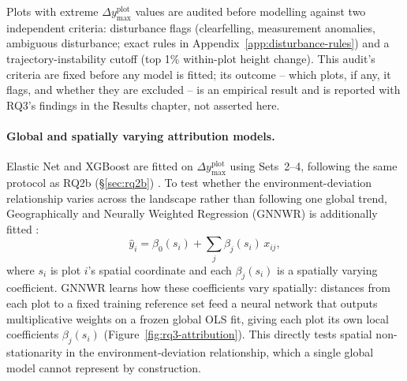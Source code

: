 {Plots with extreme $\Delta y_{\max}^{\text{plot}}$ values are audited before modelling against two independent criteria: disturbance flags (clearfelling, measurement anomalies, ambiguous disturbance; exact rules in Appendix~\ref{app:disturbance-rules}) and a trajectory-instability cutoff (top 1\% within-plot height change). This audit's criteria are fixed before any model is fitted; its outcome -- which plots, if any, it flags, and whether they are excluded -- is an empirical result and is reported with RQ3's findings in the Results chapter, not asserted here.

\paragraph*{Global and spatially varying attribution models.}
Elastic Net and XGBoost are fitted on $\Delta y_{\max}^{\text{plot}}$ using Sets~2--4, following the same protocol as RQ2b (\S\ref{sec:rq2b}) \citep{zou2005Regularization_C4_NN, chen2016XGBoost_C4_NN}. To test whether the environment-deviation relationship varies across the landscape rather than following one global trend, Geographically and Neurally Weighted Regression (GNNWR) is additionally fitted \citep{du2020Geographically_C6_GWR}:
\begin{equation}
\hat{y}_i = \beta_0(s_i) + \sum_j \beta_j(s_i)\,x_{ij},
\label{eq:gnnwr}
\end{equation}
where $s_i$ is plot $i$'s spatial coordinate and each $\beta_j(s_i)$ is a spatially varying coefficient. GNNWR learns how these coefficients vary spatially: distances from each plot to a fixed training reference set feed a neural network that outputs multiplicative weights on a frozen global OLS fit, giving each plot its own local coefficients $\beta_j(s_i)$ (Figure~\ref{fig:rq3-attribution}). This directly tests spatial non-stationarity in the environment-deviation relationship, which a single global model cannot represent by construction.

}
